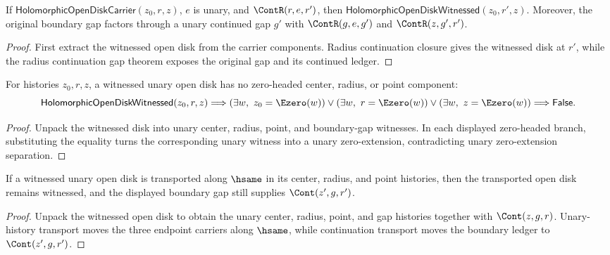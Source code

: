 \begin{theorem}
\label{thm:holo-open-disk-carrier-radius-extension-witnessed}
If \(\mathsf{HolomorphicOpenDiskCarrier}(z_0,r,z)\), \(e\) is unary, and
\(\ContR(r,e,r')\), then
\(\mathsf{HolomorphicOpenDiskWitnessed}(z_0,r',z)\). Moreover, the original
boundary gap factors through a unary continued gap \(g'\) with
\(\ContR(g,e,g')\) and \(\ContR(z,g',r')\).
\end{theorem}
\begin{proof}
First extract the witnessed open disk from the carrier components. Radius
continuation closure gives the witnessed disk at \(r'\), while the radius
continuation gap theorem exposes the original gap and its continued ledger.
\end{proof}

\begin{theorem}
\label{thm:holomorphic-open-disk-witnessed-zero-headed-component-absurd}
For histories \(z_0,r,z\), a witnessed unary open disk has no zero-headed
center, radius, or point component:
$$
\mathsf{HolomorphicOpenDiskWitnessed}(z_0,r,z)
\Longrightarrow
\left(\exists w,\ z_0=\Ezero(w)\right)\lor
\left(\exists w,\ r=\Ezero(w)\right)\lor
\left(\exists w,\ z=\Ezero(w)\right)
\Longrightarrow
\mathsf{False}.
$$
\end{theorem}
\begin{proof}
Unpack the witnessed disk into unary center, radius, point, and boundary-gap
witnesses. In each displayed zero-headed branch, substituting the equality
turns the corresponding unary witness into a unary zero-extension, contradicting
unary zero-extension separation.
\end{proof}

\begin{lemma}
\label{lem:holo-open-disk-witnessed-boundary-hsame-transport}
If a witnessed unary open disk is transported along \(\hsame\) in its center,
radius, and point histories, then the transported open disk remains witnessed,
and the displayed boundary gap still supplies \(\Cont(z',g,r')\).
\end{lemma}
\begin{proof}
Unpack the witnessed open disk to obtain the unary center, radius, point, and
gap histories together with \(\Cont(z,g,r)\). Unary-history transport moves
the three endpoint carriers along \(\hsame\), while continuation transport
moves the boundary ledger to \(\Cont(z',g,r')\).
\end{proof}


